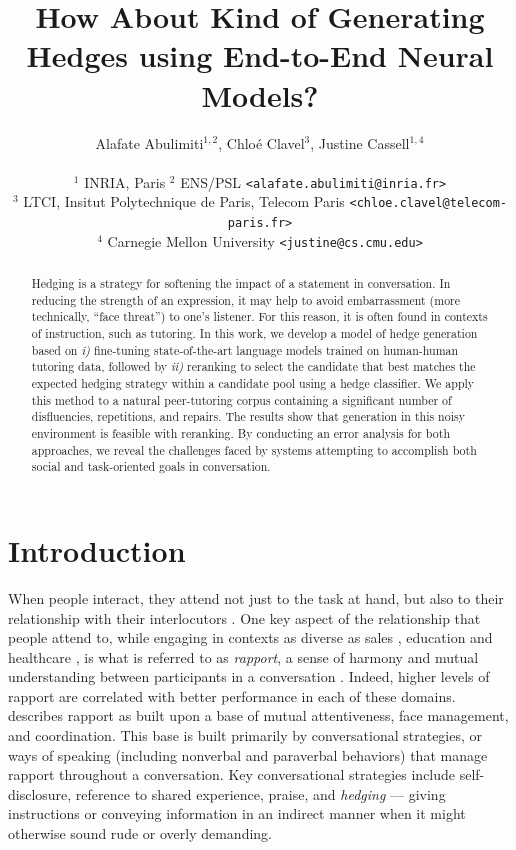 \documentclass[11pt]{article}
\title{How About Kind of Generating Hedges using End-to-End Neural Models?}
\author{Alafate Abulimiti$^{1,2}$,
Chloé Clavel$^{3}$, 
Justine Cassell$^{1,4}$
 \\~\\
 $^1$  INRIA, Paris $^2$ ENS/PSL 
  \texttt{<alafate.abulimiti@inria.fr>} 
\\
$^3$ LTCI, Insitut Polytechnique de Paris, Telecom Paris 
{\tt <chloe.clavel@telecom-paris.fr>}\\
$^4$  Carnegie Mellon University 
\texttt{<justine@cs.cmu.edu>}
}
\begin{document}
\maketitle
\begin{abstract}
Hedging is a strategy for softening the impact of a statement in conversation. In reducing the strength of an expression, it may help to avoid embarrassment (more technically, ``face threat'') to one's listener. For this reason, it is often found in contexts of instruction, such as tutoring. In this work, we develop a model of hedge generation based on \textit{i)} fine-tuning state-of-the-art language models trained on human-human tutoring data, followed by \textit{ii)} reranking to select the candidate that best matches the expected hedging strategy within a candidate pool using a hedge classifier. We apply this method to a natural peer-tutoring corpus containing a significant number of disfluencies, repetitions, and repairs. The results show that generation in this noisy environment is feasible with reranking. By conducting an error analysis for both approaches, we reveal the challenges faced by systems attempting to accomplish both social and task-oriented goals in conversation.
\end{abstract}

\section{Introduction}

When people interact, they attend not just to the task at hand, but also to their relationship with their interlocutors \citep{tracy1990multiple}. One key aspect of the relationship that people attend to, while engaging in contexts as diverse as sales \citep{gremler2008rapport, planken2005managing}, education \citep{glazier2016building, murphy2012rapport} and healthcare \citep{dimatteo1979social, leach2005rapport}, is what is referred to as \textit{rapport}, a sense of harmony and mutual understanding between participants in a conversation \citep{spencer2005politeness,tickle1990nature}. Indeed, higher levels of rapport are correlated with better performance in each of these domains. \citet{zhao2014towards} describes rapport as built upon a base of mutual attentiveness, face management, and coordination. This base is built primarily by conversational strategies, or ways of speaking (including nonverbal and paraverbal behaviors) that manage rapport throughout a conversation. Key conversational strategies include self-disclosure, reference to shared experience, praise, and \textit{hedging} --- giving instructions or conveying information in an indirect manner when it might otherwise sound rude or overly demanding.
\end{document}
